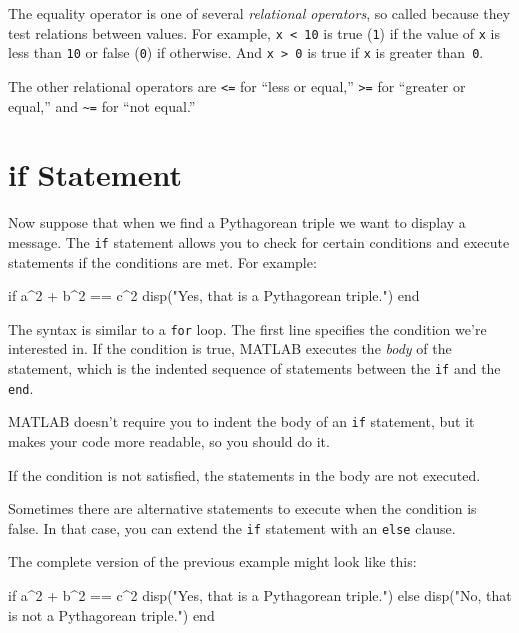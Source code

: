 \documentclass[../../book.tex]{subfiles}
\begin{document}
The equality operator is one of several \emph{relational operators}, so called because they test relations between values.
For example, \lstinline{x < 10} is true (\lstinline{1}) if the value of \lstinline{x} is less than \lstinline{10} or false (\lstinline{0}) if otherwise.  And \lstinline{x > 0} is true if \lstinline{x} is greater than~\lstinline{0}.

The other relational operators are \lstinline{<=} for ``less or equal,'' \lstinline{>=} for ``greater or equal,'' and  \lstinline{~=} for ``not equal.''


\section{if Statement}


Now suppose that when we find a Pythagorean triple we want to display a message.
The \lstinline{if} statement allows you to check for certain conditions
and execute statements if the conditions are met.  For example:

\begin{code}
if a^2 + b^2 == c^2
    disp("Yes, that is a Pythagorean triple.")
end
\end{code}

The syntax is similar to a \lstinline{for} loop.  The first line
specifies the condition we're interested in.  If the condition is true,
MATLAB executes the \emph{body} of the statement, which is the indented sequence of
statements between the \lstinline{if} and the \lstinline{end}.


MATLAB doesn't require you to indent the body of an \lstinline{if}
statement, but it makes your code more readable, so you should do it.

If the condition is not satisfied, the statements in the body are
not \mbox{executed}.

Sometimes there are alternative statements to
execute when the condition is false.  In that case, you can extend
the \lstinline{if} statement with an \lstinline{else} clause.


The complete version of the previous example might look like this:

\begin{code}
if a^2 + b^2 == c^2
    disp("Yes, that is a Pythagorean triple.")
else
    disp("No, that is not a Pythagorean triple.")
end
\end{code}
\end{document}
